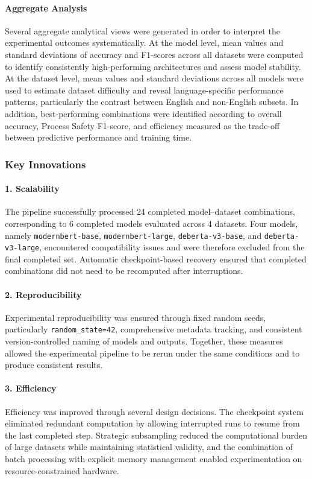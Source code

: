 \documentclass[11pt, titlepage, bibliography=totoc]{scrreprt}
\begin{document}
\paragraph{Aggregate Analysis}
Several aggregate analytical views were generated in order to interpret the experimental outcomes systematically. At the model level, mean values and standard deviations of accuracy and F1-scores across all datasets were computed to identify consistently high-performing architectures and assess model stability. At the dataset level, mean values and standard deviations across all models were used to estimate dataset difficulty and reveal language-specific performance patterns, particularly the contrast between English and non-English subsets. In addition, best-performing combinations were identified according to overall accuracy, Process Safety F1-score, and efficiency measured as the trade-off between predictive performance and training time.

\subsubsection{Key Innovations}

\paragraph{1. Scalability}
The pipeline successfully processed 24 completed model--dataset combinations, corresponding to 6 completed models evaluated across 4 datasets. Four models, namely \texttt{modernbert-base}, \texttt{modernbert-large}, \texttt{deberta-v3-base}, and \texttt{deberta-v3-large}, encountered compatibility issues and were therefore excluded from the final completed set. Automatic checkpoint-based recovery ensured that completed combinations did not need to be recomputed after interruptions.

\paragraph{2. Reproducibility}
Experimental reproducibility was ensured through fixed random seeds, particularly \texttt{random\_state=42}, comprehensive metadata tracking, and consistent version-controlled naming of models and outputs. Together, these measures allowed the experimental pipeline to be rerun under the same conditions and to produce consistent results.

\paragraph{3. Efficiency}
Efficiency was improved through several design decisions. The checkpoint system eliminated redundant computation by allowing interrupted runs to resume from the last completed step. Strategic subsampling reduced the computational burden of large datasets while maintaining statistical validity, and the combination of batch processing with explicit memory management enabled experimentation on resource-constrained hardware.
\end{document}
